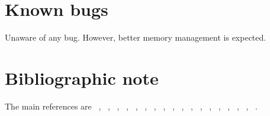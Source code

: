 \documentclass[11pt,a4paper]{article}
\begin{document}
\section{Known bugs}

Unaware of any bug. However, better memory management is expected.

\section{Bibliographic note}

The main references are ~\cite{chow60}, ~\cite{guo92}, ~\cite{wcn92}, ~\cite{gholamic94},
~\cite{risch96}, ~\cite{spielman96}, ~\cite{risch97}, ~\cite{miller97}, ~\cite{sham97}, 
~\cite{sham98}, ~\cite{devlin99}, ~\cite{zhao99}, ~\cite{guo00}, 
~\cite{hirotsu01}, ~\cite{zhao02}, ~\cite{zaykin02}, ~\cite{zhao04}, ~\cite{skol06}.


\end{document}
